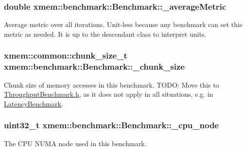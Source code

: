 \subsubsection[{\+\_\+average\+Metric}]{\setlength{\rightskip}{0pt plus 5cm}double xmem\+::benchmark\+::\+Benchmark\+::\+\_\+average\+Metric\hspace{0.3cm}{\ttfamily [protected]}}\label{classxmem_1_1benchmark_1_1_benchmark_a303386b7b243e39f2ca9a041ae819162}
Average metric over all iterations. Unit-\/less because any benchmark can set this metric as needed. It is up to the descendant class to interpret units. \hypertarget{classxmem_1_1benchmark_1_1_benchmark_ae01156a2db05a6e3f7928a7433688f56}{}
\subsubsection[{\+\_\+chunk\+\_\+size}]{\setlength{\rightskip}{0pt plus 5cm}xmem\+::common\+::chunk\+\_\+size\+\_\+t xmem\+::benchmark\+::\+Benchmark\+::\+\_\+chunk\+\_\+size\hspace{0.3cm}{\ttfamily [protected]}}\label{classxmem_1_1benchmark_1_1_benchmark_ae01156a2db05a6e3f7928a7433688f56}
Chunk size of memory accesses in this benchmark. T\+O\+D\+O\+: Move this to \hyperlink{_throughput_benchmark_8h}{Throughput\+Benchmark.\+h}, as it does not apply in all situations, e.\+g. in \hyperlink{classxmem_1_1benchmark_1_1_latency_benchmark}{Latency\+Benchmark}. \hypertarget{classxmem_1_1benchmark_1_1_benchmark_ab840cb1f53439eeeb6bdce7cd1eed78b}{}
\subsubsection[{\+\_\+cpu\+\_\+node}]{\setlength{\rightskip}{0pt plus 5cm}uint32\+\_\+t xmem\+::benchmark\+::\+Benchmark\+::\+\_\+cpu\+\_\+node\hspace{0.3cm}{\ttfamily [protected]}}\label{classxmem_1_1benchmark_1_1_benchmark_ab840cb1f53439eeeb6bdce7cd1eed78b}
The C\+P\+U N\+U\+M\+A node used in this benchmark. \hypertarget{classxmem_1_1benchmark_1_1_benchmark_a6d4445364d9b6f17ec78be6c8cf253f1}{}

